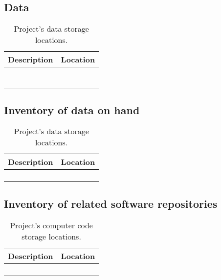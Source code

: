 \documentclass[10pt,letterpaper]{article}
\begin{document}

\subsection*{Data}

\begin{table}
    \centering
    \begin{tabular}{cc}
        Description & Location\\
        \toprule
         & \\
         & \\
         & \\
         & \\
         & \\
         & \\
         & \\
         \bottomrule
    \end{tabular}
    \caption{Project's data storage locations.}
    \label{tab:my_label}
\end{table}

\subsection*{Inventory of data on hand}

\begin{table}
    \centering
    \begin{tabular}{cc}
        Description & Location\\
        \toprule
         & \\
         & \\
         & \\
         & \\
         \bottomrule
    \end{tabular}
    \caption{Project's data storage locations.}
    \label{tab:my_label}
\end{table}


\subsection*{Inventory of related software repositories}


\begin{table}
    \centering
    \begin{tabular}{cc}
        Description & Location\\
        \toprule
         & \\
         & \\
         & \\
         & \\
         \bottomrule
    \end{tabular}
    \caption{Project's computer code storage locations.}
    \label{tab:my_label}
\end{table}
\end{document}
